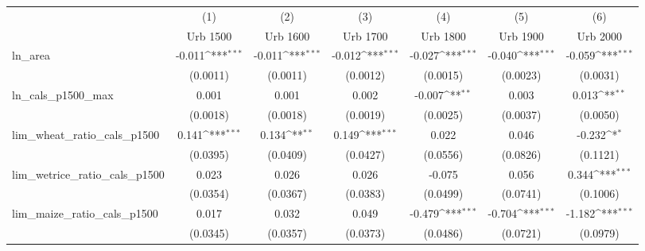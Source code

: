 {
\def\sym#1{\ifmmode^{#1}\else\(^{#1}\)\fi}
\begin{tabular}{l*{6}{c}}
\toprule
                    &\multicolumn{1}{c}{(1)}&\multicolumn{1}{c}{(2)}&\multicolumn{1}{c}{(3)}&\multicolumn{1}{c}{(4)}&\multicolumn{1}{c}{(5)}&\multicolumn{1}{c}{(6)}\\
                    &\multicolumn{1}{c}{Urb 1500}&\multicolumn{1}{c}{Urb 1600}&\multicolumn{1}{c}{Urb 1700}&\multicolumn{1}{c}{Urb 1800}&\multicolumn{1}{c}{Urb 1900}&\multicolumn{1}{c}{Urb 2000}\\
\midrule
ln\_area             &      -0.011\sym{***}&      -0.011\sym{***}&      -0.012\sym{***}&      -0.027\sym{***}&      -0.040\sym{***}&      -0.059\sym{***}\\
                    &    (0.0011)         &    (0.0011)         &    (0.0012)         &    (0.0015)         &    (0.0023)         &    (0.0031)         \\
\addlinespace
ln\_cals\_p1500\_max   &       0.001         &       0.001         &       0.002         &      -0.007\sym{**} &       0.003         &       0.013\sym{**} \\
                    &    (0.0018)         &    (0.0018)         &    (0.0019)         &    (0.0025)         &    (0.0037)         &    (0.0050)         \\
\addlinespace
lim\_wheat\_ratio\_cals\_p1500&       0.141\sym{***}&       0.134\sym{**} &       0.149\sym{***}&       0.022         &       0.046         &      -0.232\sym{*}  \\
                    &    (0.0395)         &    (0.0409)         &    (0.0427)         &    (0.0556)         &    (0.0826)         &    (0.1121)         \\
\addlinespace
lim\_wetrice\_ratio\_cals\_p1500&       0.023         &       0.026         &       0.026         &      -0.075         &       0.056         &       0.344\sym{***}\\
                    &    (0.0354)         &    (0.0367)         &    (0.0383)         &    (0.0499)         &    (0.0741)         &    (0.1006)         \\
\addlinespace
lim\_maize\_ratio\_cals\_p1500&       0.017         &       0.032         &       0.049         &      -0.479\sym{***}&      -0.704\sym{***}&      -1.182\sym{***}\\
                    &    (0.0345)         &    (0.0357)         &    (0.0373)         &    (0.0486)         &    (0.0721)         &    (0.0979)         \\

\end{tabular}}
